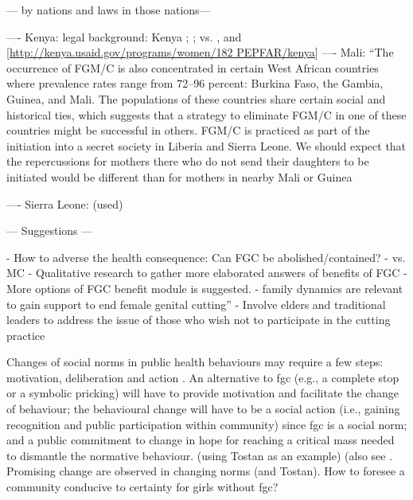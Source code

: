 \documentclass[12pt,]{article}
\begin{document}
— by nations and laws in those nations—



---- Kenya: legal background:  Kenya \cite{GKEN01}; \cite{UNIC13}; 
 vs. \cite{Chia14, Hayf05}, and [\url{http://kenya.usaid.gov/programs/women/182 PEPFAR/kenya}]
---- Mali: ``The occurrence of FGM/C is also concentrated in certain West African countries where prevalence rates range from 72–96 percent: Burkina Faso, the Gambia, Guinea, and Mali. The populations of these countries share certain social and historical ties, which suggests that a strategy to eliminate FGM/C in one of these countries might be successful in others. FGM/C is practiced as part of the initiation into a secret society in Liberia and Sierra Leone. We should expect that the repercussions for mothers there who do not send their daughters to be initiated would be different than for mothers in nearby Mali or Guinea \cite{YodaWang13}

---- Sierra Leone: 
\cite{Sagn14}  (used) 


— Suggestions —

- How to adverse the health consequence:  Can FGC be abolished/contained?
- vs. MC
- Qualitative research to gather more elaborated answers of benefits of FGC
- More options of FGC benefit module is suggested.
- family dynamics are relevant to gain support to end female genital cutting”\cite{Hayf06}
- Involve elders and traditional leaders to address the issue of those who wish not to participate in the cutting practice \cite{ChegAske04, more}

Changes of social norms in public health behaviours may require a few steps:  motivation, deliberation and action \cite{CislHeis18a}.  An alternative to fgc (e.g., a complete stop or a symbolic pricking) will have to provide motivation and facilitate the change of behaviour; the behavioural change will have to be a social action (i.e., gaining recognition and public participation within community) since fgc is a social norm;  and a public commitment to change in hope for reaching a critical mass needed to dismantle the normative behaviour. (using Tostan as an example) (also see \cite{Youn15}.  Promising change are observed in changing norms \cite{EvanSnid19} (and Tostan).  How to foresee a community conducive to certainty for girls without fgc?
\end{document}
